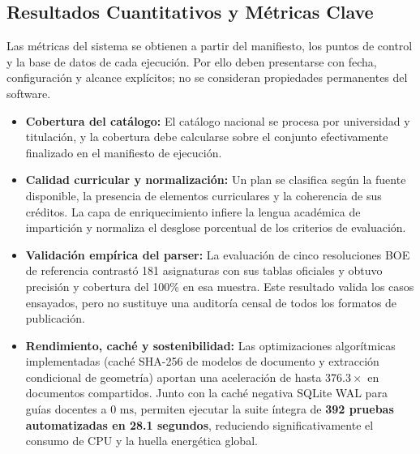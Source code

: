 \subsection{Resultados Cuantitativos y Métricas Clave}
Las métricas del sistema se obtienen a partir del manifiesto, los puntos de control y la base de datos de cada ejecución. Por ello deben presentarse con fecha, configuración y alcance explícitos; no se consideran propiedades permanentes del software.
\begin{itemize}
    \item \textbf{Cobertura del catálogo:} El catálogo nacional se procesa por universidad y titulación, y la cobertura debe calcularse sobre el conjunto efectivamente finalizado en el manifiesto de ejecución.
    \item \textbf{Calidad curricular y normalización:} Un plan se clasifica según la fuente disponible, la presencia de elementos curriculares y la coherencia de sus créditos. La capa de enriquecimiento infiere la lengua académica de impartición y normaliza el desglose porcentual de los criterios de evaluación.
    \item \textbf{Validación empírica del parser:} La evaluación de cinco resoluciones BOE de referencia contrastó 181 asignaturas con sus tablas oficiales y obtuvo precisión y cobertura del 100\% en esa muestra. Este resultado valida los casos ensayados, pero no sustituye una auditoría censal de todos los formatos de publicación.
    \item \textbf{Rendimiento, caché y sostenibilidad:} Las optimizaciones algorítmicas implementadas (caché SHA-256 de modelos de documento y extracción condicional de geometría) aportan una aceleración de hasta $\mathbf{376.3\times}$ en documentos compartidos. Junto con la caché negativa SQLite WAL para guías docentes a $0\text{ ms}$, permiten ejecutar la suite íntegra de \textbf{392 pruebas automatizadas en 28.1 segundos}, reduciendo significativamente el consumo de CPU y la huella energética global.
\end{itemize}


